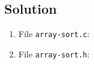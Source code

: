 
\subsection*{Solution}

\lstset{language=c,tabsize=4}
\begin{enumerate}
\item File \texttt{array-sort.c}:

\item File \texttt{array-sort.h}:

\end{enumerate}
